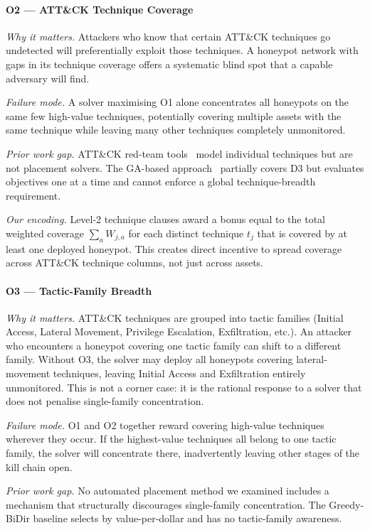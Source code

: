 \documentclass[journal]{IEEEtran}
\begin{document}
\paragraph{O2 --- ATT\&CK Technique Coverage}
\textit{Why it matters.}
Attackers who know that certain ATT\&CK techniques go undetected will
preferentially exploit those techniques. A honeypot network with gaps
in its technique coverage offers a systematic blind spot that a
capable adversary will find.

\textit{Failure mode.}
A solver maximising O1 alone concentrates all honeypots on the same
few high-value techniques, potentially covering multiple assets with
the same technique while leaving many other techniques completely
unmonitored.

\textit{Prior work gap.}
ATT\&CK red-team tools~\cite{applebaum2016} model individual
techniques but are not placement solvers. The GA-based
approach~\cite{hemberg2018} partially covers D3 but evaluates
objectives one at a time and cannot enforce a global technique-breadth
requirement.

\textit{Our encoding.}
Level-2 technique clauses award a bonus equal to the total weighted
coverage $\sum_a W_{j,a}$ for each distinct technique $t_j$ that is
covered by at least one deployed honeypot. This creates direct
incentive to spread coverage across ATT\&CK technique columns, not
just across assets.

\paragraph{O3 --- Tactic-Family Breadth}
\textit{Why it matters.}
ATT\&CK techniques are grouped into tactic families (Initial Access,
Lateral Movement, Privilege Escalation, Exfiltration, etc.). An
attacker who encounters a honeypot covering one tactic family can
shift to a different family. Without O3, the solver may deploy all
honeypots covering lateral-movement techniques, leaving Initial
Access and Exfiltration entirely unmonitored. This is not a corner
case: it is the rational response to a solver that does not penalise
single-family concentration.

\textit{Failure mode.}
O1 and O2 together reward covering high-value techniques wherever
they occur. If the highest-value techniques all belong to one tactic
family, the solver will concentrate there, inadvertently leaving
other stages of the kill chain open.

\textit{Prior work gap.}
No automated placement method we examined includes a mechanism that
structurally discourages single-family concentration. The Greedy-BiDir
baseline selects by value-per-dollar and has no tactic-family
awareness.
\end{document}
